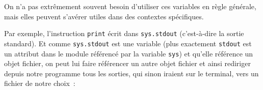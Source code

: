 \begin{Shaded}
\begin{Highlighting}[]
\OperatorTok{<}\OperatorTok{=}\OperatorTok{=}\OperatorTok{=}\OperatorTok{>}
\OperatorTok{<}\OperatorTok{=}\OperatorTok{=}\OperatorTok{=}\OperatorTok{>}
\OperatorTok{<}\OperatorTok{=}\OperatorTok{=}\OperatorTok{=}\OperatorTok{>}
\end{Highlighting}
\end{Shaded}

    On n'a pas extrêmement souvent besoin d'utiliser ces variables en règle
générale, mais elles peuvent s'avérer utiles dans des contextes
spécifiques.

Par exemple, l'instruction \texttt{print} écrit dans \texttt{sys.stdout}
(c'est-à-dire la sortie standard). Et comme \texttt{sys.stdout} est une
variable (plus exactement \texttt{stdout} est un attribut dans le module
référencé par la variable \texttt{sys}) et qu'elle référence un objet
fichier, on peut lui faire référencer un autre objet fichier et ainsi
rediriger depuis notre programme tous les sorties, qui sinon iraient sur
le terminal, vers un fichier de notre choix~:

